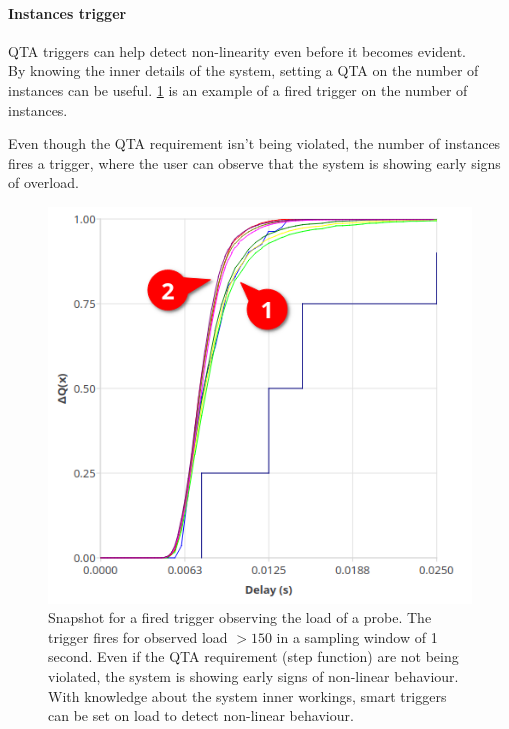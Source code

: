         \paragraph{Instances trigger}

        QTA triggers can help detect non-linearity even before it becomes evident. \\
        By knowing the inner details of the system, setting a QTA on the number of instances can be useful. \cref{fig:qta_trig} is an example of a fired trigger on the number of instances.

        Even though the QTA requirement isn't being violated, the number of instances fires a trigger, where the user can observe that the system is showing early signs of overload.
        \begin{figure}[H]
            \begin{center}
                \includegraphics[scale=0.5]{img/overload_2/fired_samplea.png}
            \end{center}
            \caption{Snapshot for a fired trigger observing the load of a probe. The trigger fires for observed load $> 150$ in a sampling window of 1 second. Even if the QTA requirement (step function) are not being violated, the system is showing early signs of non-linear behaviour.
            \\
            With knowledge about the system inner workings, smart triggers can be set on load to detect non-linear behaviour.}
            \label{fig:qta_trig}
        \end{figure}
  
